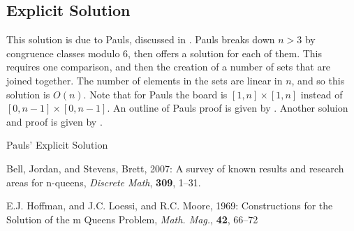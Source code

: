\documentclass{article}
\begin{document}
\subsection*{Explicit Solution}
\label{sub:explicit_solution}

This solution is due to Pauls, discussed in \cite{jordanbell07}. Pauls breaks
down $n > 3$ by congruence classes modulo 6, then offers a solution for each of
them. This requires one comparison, and then the creation of a number of sets
that are joined together. The number of elements in the sets are linear in $n$,
and so this solution is $O(n)$. Note that for Pauls the board is $[1, n] \times
[1, n]$ instead of $[0, n-1] \times [0, n-1]$. An outline of Pauls proof is
given by \cite{jordanbell07}. Another soluion and proof is given by
\cite{hoffman69}.

\begin{algorithm}[H]
    \caption{Pauls' Explicit Solution}



\end{algorithm}

\pagebreak

\begin{thebibliography}{9}

    Bell, Jordan, and Stevens, Brett,
    2007:
    A survey of known results and research areas for n-queens,
    \emph{Discrete Math},
    \textbf{309},
    1--31.

    E.J. Hoffman, and J.C. Loessi, and R.C. Moore,
    1969:
    Constructions for the Solution of the m Queens Problem,
    \emph{Math. Mag.},
    \textbf{42},
    66--72

\end{thebibliography}
\end{document}
